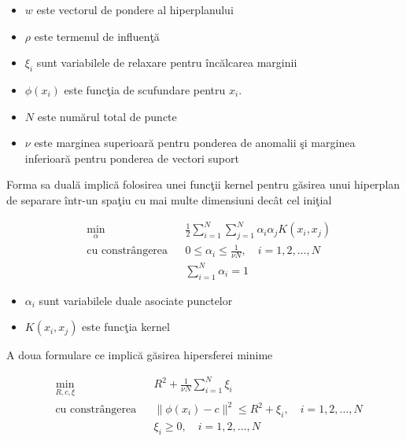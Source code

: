     \begin{itemize}
        \item $w$ este vectorul de pondere al hiperplanului
        \item $\rho$ este termenul de influenţă
        \item $\xi_i$ sunt variabilele de relaxare pentru încălcarea marginii
        \item $\phi(x_i)$ este funcţia de scufundare pentru $x_i$.
        \item $N$ este numărul total de puncte
        \item $\nu$ este marginea superioară pentru ponderea de anomalii şi marginea 
        inferioară pentru ponderea de vectori suport
    
    \end{itemize}


    Forma sa duală implică folosirea unei funcţii kernel pentru găsirea unui hiperplan 
    de separare într-un spaţiu cu mai multe dimensiuni decât cel iniţial


    \begin{equation}
        \begin{aligned}
        & \underset{\alpha}{\text{min}}
        & & \frac{1}{2} \sum_{i=1}^{N} \sum_{j=1}^{N} \alpha_i \alpha_j K(x_i, x_j) \\
        & \text{cu constrângerea}
        & & 0 \leq \alpha_i \leq \frac{1}{\nu N}, \quad i=1,2,\ldots,N \\
        &&& \sum_{i=1}^{N} \alpha_i = 1
        \end{aligned}
        \end{equation}
    
    \begin{itemize}
        \item $\alpha_i$ sunt variabilele duale asociate punctelor 
        \item $K(x_i, x_j)$ este funcţia kernel
    \end{itemize}

A doua formulare ce implică găsirea hipersferei minime

    \begin{equation}
        \begin{aligned}
        & \underset{R, c, \xi}{\text{min}}
        & & R^2 + \frac{1}{\nu N} \sum_{i=1}^{N} \xi_i \\
        & \text{cu constrângerea}
        & & \|\phi(x_i) - c\|^2 \leq R^2 + \xi_i, \quad i=1,2,\ldots,N \\
        &&& \xi_i \geq 0, \quad i=1,2,\ldots,N \\
        \end{aligned}
        \end{equation}
        
